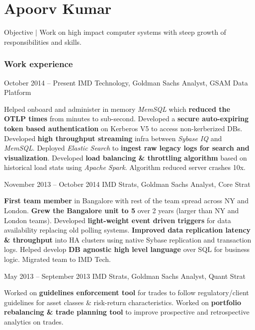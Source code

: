 \documentclass{tccv}
\begin{document}
\part{Apoorv Kumar}
	 {\selectfont\large Objective $\vert$ \selectfont\large Work on high impact computer systems with steep growth of responsibilities and skills.}
     
\section{Work experience}

\begin{eventlist}

\item{October 2014 -- Present}
     {IMD Technology, Goldman Sachs}
     {Analyst, GSAM Data Platform}


Helped onboard and administer in memory \textit{MemSQL} which \textbf{reduced
the OTLP times} from minutes to sub-second. Developed a \textbf{secure auto-expiring token based authentication} on Kerberos V5 to access non-kerberized DBs. Developed \textbf{high throughput streaming} infra between \textit{Sybase IQ} and \textit{MemSQL}. Deployed \textit{Elastic Search} to \textbf{ingest raw legacy logs for search and visualization}. Developed \textbf{load balancing \& throttling algorithm} based on historical load stats using \textit{Apache Spark}. Algorithm reduced server crashes 10x.

\item{November 2013 -- October 2014}
     {IMD Strats, Goldman Sachs}
     {Analyst, Core Strat}

\textbf{First team member} in Bangalore with rest of the team spread across NY and London. \textbf{Grew the Bangalore unit to 5} over 2 years (larger than NY and London teams). Developed \textbf{light-weight event driven triggers} for data availability replacing old polling systems. \textbf{Improved data replication latency \& throughput} into HA clusters using native Sybase replication and transaction logs. Helped develop \textbf{DB agnostic high level language} over SQL for business logic.
Migrated team to IMD Tech.

\item{May 2013 -- September 2013}
     {IMD Strats, Goldman Sachs}
     {Analyst, Quant Strat}

Worked on \textbf{guidelines enforcement tool} for trades to follow regulatory/client guidelines for asset classes \& risk-return characteristics. Worked on \textbf{portfolio rebalancing \& trade planning tool} to improve prospective and retrospective analytics on trades. 


\end{eventlist}
\end{document}
